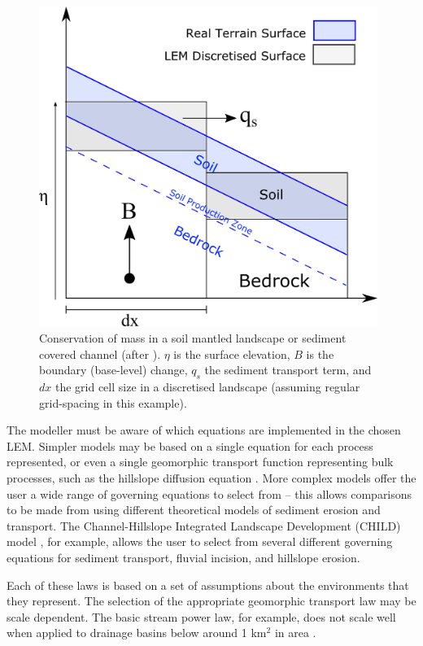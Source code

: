\begin{figure}[t]
\includegraphics[width=11cm]{LEMFinalRevisedmanuscriptDAVFinalrevisions-img/LEMFinalRevisedmanuscriptDAVFinalrevisions-img003.png} 
\caption{Conservation of mass in a soil mantled landscape or sediment covered channel (after \citet{dietrich2003geomorphic,Tucker2010}). $\eta $ is the surface elevation, \(B\) is the boundary (base-level) change, \(q_s\) the sediment transport term, and \(dx\) the grid cell size in a discretised landscape (assuming regular grid-spacing in this example).}
\label{fig_conservation_mass}
\end{figure}

The modeller must be aware of which equations are implemented in the chosen LEM. Simpler models may be based on a single equation for each process represented, or even a single geomorphic transport function representing bulk processes, such as the hillslope diffusion equation \citep{Culling1960}. More complex models offer the user a wide range of governing equations to select from – this allows comparisons to be made from using different theoretical models of sediment erosion and transport. The Channel-Hillslope Integrated Landscape Development (CHILD) model \citep{tucker2001child}, for example, allows the user to select from several different governing equations for sediment transport, fluvial incision, and hillslope erosion.  

Each of these laws is based on a set of assumptions about the environments that they represent. The selection of the appropriate geomorphic transport law may be scale dependent. The basic stream power law, for example, does not scale well when applied to drainage basins below around 1 km\(^2\) in area \citep{Hergarten2015,Stock2003}.

